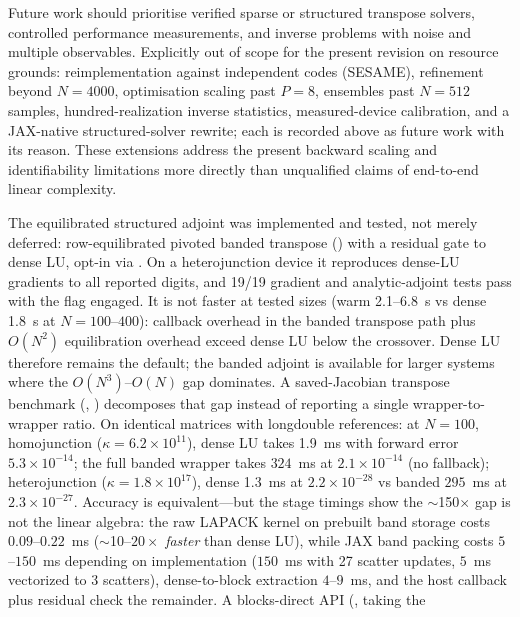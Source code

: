 Future work should prioritise verified sparse or structured transpose
solvers, controlled performance measurements, and inverse problems with
noise and multiple observables. Explicitly out of scope for the present
revision on resource grounds: reimplementation against independent codes
(SESAME), refinement beyond $N=4000$, optimisation scaling past $P=8$,
ensembles past $N=512$ samples, hundred-realization inverse statistics,
measured-device calibration, and a JAX-native structured-solver rewrite;
each is recorded above as future work with its reason. These extensions address the present
backward scaling and identifiability limitations more directly than
unqualified claims of end-to-end linear complexity.

The equilibrated structured adjoint was implemented and tested, not
merely deferred: row-equilibrated pivoted banded transpose
() with a residual gate to dense LU,
opt-in via . On a heterojunction
device it reproduces dense-LU gradients to all reported digits, and
19/19 gradient and analytic-adjoint tests pass with the flag engaged.
It is not faster at tested sizes (warm 2.1--6.8~s vs dense 1.8~s at
$N=100$--$400$): callback overhead in the banded transpose path plus $O(N^2)$ equilibration
overhead exceed dense LU below the crossover. Dense LU therefore remains
the default; the banded adjoint is available for larger systems where
the $O(N^3)$--$O(N)$ gap dominates. A saved-Jacobian transpose benchmark
(,
) decomposes that
gap instead of reporting a single wrapper-to-wrapper ratio. On identical
matrices with longdouble references: at $N=100$, homojunction
($\kappa=6.2\times10^{11}$), dense LU takes 1.9~ms with forward error
$5.3\times10^{-14}$; the full banded wrapper takes $324$~ms at
$2.1\times10^{-14}$ (no fallback); heterojunction
($\kappa=1.8\times10^{17}$), dense 1.3~ms at $2.2\times10^{-28}$ vs
banded $295$~ms at $2.3\times10^{-27}$. Accuracy is equivalent---but the
stage timings show the $\sim$150$\times$ gap is not the linear algebra:
the raw LAPACK  kernel on prebuilt band storage costs
$0.09$--$0.22$~ms ($\sim$10--$20\times$ \emph{faster} than dense LU),
while JAX band packing costs $5$--$150$~ms depending on implementation
($150$~ms with 27 scatter updates, $5$~ms vectorized to 3 scatters),
dense-to-block extraction $4$--$9$~ms, and the host callback plus
residual check the remainder.
A blocks-direct API (, taking the
